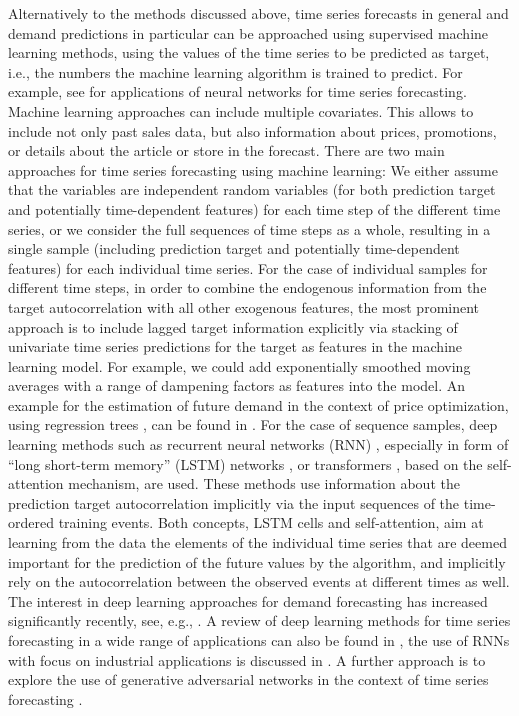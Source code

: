 \documentclass[BCOR=1mm, DIV=calc,10pt,
twoside=true,
twocolumn,
headings=normal]{scrartcl}
\begin{document}
Alternatively to the methods discussed above, time series forecasts in general and demand predictions in particular can be approached using supervised machine learning methods, using the values of the time series to be predicted as target, i.e., the numbers the machine learning algorithm is trained to predict.  For example, see \cite{Zhang2012,remus2001neural} for applications of neural networks for time series forecasting. Machine learning approaches can include multiple covariates. This allows to include not only past sales data, but also information about prices, promotions, or details about the article or store in the forecast. There are two main approaches for time series forecasting using  machine learning: We either assume that the variables are independent random variables (for both prediction target and potentially time-dependent features) for each time step of the different time series, or we consider the full sequences of time steps as a whole, resulting in a single sample (including prediction target and potentially time-dependent features) for each individual time series. For the case of individual samples for different time steps, in order to combine the endogenous information from the target autocorrelation with all other exogenous features, the most prominent approach is to include lagged target information explicitly via stacking of univariate time series predictions for the target as features in the machine learning model. For example, we could add exponentially smoothed moving averages with a range of dampening factors as features into the model. An example for the estimation of future demand in the context of price optimization, using regression trees \cite{breiman1984}, can be found in \cite{ferreira2016analytics}. For the case of sequence samples, deep learning methods such as recurrent neural networks (RNN) \cite{rnn}, especially in form of ``long short-term memory'' (LSTM) networks \cite{hochreiter1997long}, or transformers \cite{transformer}, based on the self-attention mechanism, are used. These methods use information about the prediction target autocorrelation implicitly via the input sequences of the time-ordered training events. Both concepts, LSTM cells and self-attention, aim at learning from the data the elements of the individual time series that are deemed important for the prediction of the future values by the algorithm, and implicitly rely on the autocorrelation between the observed events at different times as well. The interest in deep learning approaches for demand forecasting has increased significantly recently, see, e.g., \cite{bandara2019sales,yu2017application, goyal2018solution,helmini2019sales, golkabek2020demand}. A review of deep learning methods for time series forecasting in a wide range of applications can also be found in \cite{langkvist2014review}, the use of RNNs with focus on industrial applications is discussed in \cite{dixon2020industrial}. A further approach is to explore the use of generative adversarial networks \cite{goodfellow2014generative} in the context of time series forecasting \cite{haas2020statistical, ramponi2018t, smith2020conditional}. 
\end{document}
